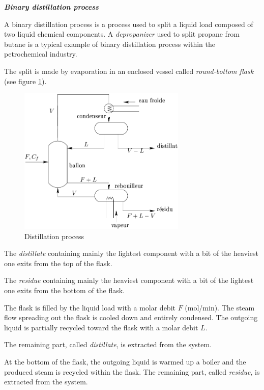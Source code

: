 \begin{exemple}{\bf \em Binary distillation process}

A binary distillation process is a process used to split a liquid load composed of two liquid chemical components.
A {\it depropanizer} used to split propane from butane is a typical example of binary distillation process within the petrochemical industry.

The split is made by evaporation in an enclosed vessel called {\em round-bottom flask} (see figure \ref{Fig:distillation}).
\begin{figure}[h]
\begin{center}
\includegraphics[width=8cm]{proc_distil}
\caption{Distillation process}
\label{Fig:distillation}
\end{center} 
\end{figure}
The {\it distillate} containing mainly the lightest component with a bit of the heaviest one exits from the top of the flask.

The {\it residue} containing mainly the heaviest component with a bit of the lightest one exits from the bottom of the flask.

The flask is filled by the liquid load with a molar debit $F$ (mol/min). 
The steam flow spreading out the flask is cooled down and entirely condensed.
The outgoing liquid is partially recycled toward the flask with a molar debit $L$. 

The remaining part, called {\it distillate}, is extracted from the system.

At the bottom of the flask, the outgoing liquid is warmed up a boiler and the produced steam is recycled within the flask.
The remaining part, called {\it residue}, is extracted from the system.


\end{exemple}
